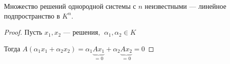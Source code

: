 \begin{theorem-non}
    Множество решений однородной системы  с $n$ неизвестными --- линейное подпространство в $K^n$.

    \begin{proof}
        Пусть $x_1, x_2$ --- решения, $\; \alpha_1, \alpha_2 \in K$    
        
        Тогда $A$$(\alpha_1 x_1 + \alpha_2 x_2) = \alpha_1 \underbrace{Ax_1}_{\text{ = 0}} + \alpha_2 \underbrace{Ax_2}_{\text{ = 0}} = 0$
    \end{proof}
    
\end{theorem-non}